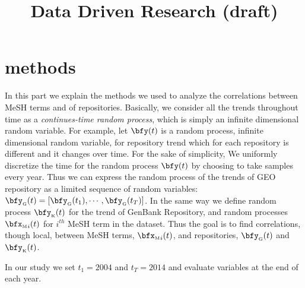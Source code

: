 \documentclass[twoside,11pt]{article}
\def\bfyg{\bfy_{\text{\tiny G}}}
\def\bfyk{\bfy_{\text{\tiny K}}}
\def\bfxm{{\bfx_{\text{\tiny M}}}}
\begin{document}
\title{Data Driven Research (draft)}



\maketitle



\section{methods} 
In this part we explain the methods we used to analyze the correlations between MeSH terms and of repositories.
Basically, we consider all the trends throughout time as a \emph{continues-time random process}, which is simply an infinite dimensional random variable. For example, let $\bfy(t)$ is a random process, infinite dimensional random variable, for repository trend which for each repository is different and it changes over time. For the sake of simplicity, We uniformly discretize the time for the random process $\bfy(t)$ by choosing to take samples every year. Thus we can express the random process of the trends of GEO repository as a limited sequence of random variables: $\bfyg (t) = [\bfyg(t_1), \cdots, \bfyg(t_T) ]$.  In the same way we define random process $\bfyk(t)$ for the trend  of GenBank Repository, and random processes $\bfxm_i(t)$ for $i^{th}$ MeSH term in the dataset. Thus the goal is to find correlations, though local, between MeSH terms, $\bfxm_i(t)$, and repositories, $\bfyg(t)$ and $\bfyk(t)$.

In our study we set $t_1=2004$ and $t_T=2014$ and evaluate variables at the end of each year.
\end{document}
